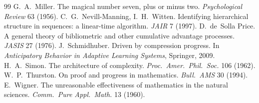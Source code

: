 \documentclass[11pt]{article}
\theoremstyle{remark}
\begin{document}
\begin{thebibliography}{99}
 G.~A.~Miller. The magical number seven, plus or minus two. \emph{Psychological Review} 63 (1956).
 C.~G.~Nevill-Manning, I.~H.~Witten. Identifying hierarchical structure in sequences: a linear-time algorithm. \emph{JAIR} 7 (1997).
 D.~de~Solla Price. A general theory of bibliometric and other cumulative advantage processes. \emph{JASIS} 27 (1976).
 J.~Schmidhuber. Driven by compression progress. In \emph{Anticipatory Behavior in Adaptive Learning Systems}, Springer, 2009.
 H.~A.~Simon. The architecture of complexity. \emph{Proc.\ Amer.\ Phil.\ Soc.} 106 (1962).
 W.~P.~Thurston. On proof and progress in mathematics. \emph{Bull.\ AMS} 30 (1994).
 E.~Wigner. The unreasonable effectiveness of mathematics in the natural sciences. \emph{Comm.\ Pure Appl.\ Math.} 13 (1960).
\end{thebibliography}
\end{document}
